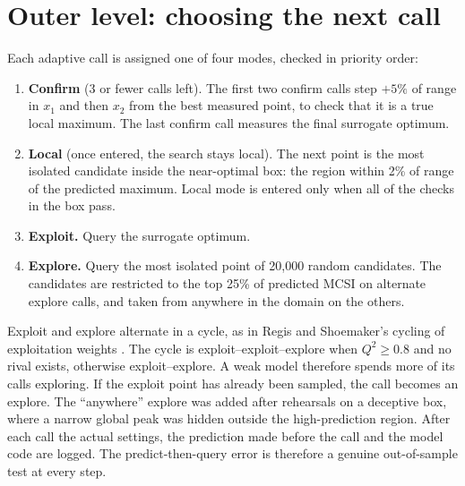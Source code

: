 \documentclass[11pt,a4paper]{article}
\newcommand{\Qsq}{Q^2}
\begin{document}
\section{Outer level: choosing the next call}
Each adaptive call is assigned one of four modes, checked in priority order:
\begin{enumerate}
\setlength{\itemsep}{0pt}
\item \textbf{Confirm} (3 or fewer calls left).
  The first two confirm calls step $+5\%$ of range in $x_1$ and then $x_2$ from the best measured point, to check that it is a true local maximum.
  The last confirm call measures the final surrogate optimum.
\item \textbf{Local} (once entered, the search stays local).
  The next point is the most isolated candidate inside the near-optimal box: the region within 2\% of range of the predicted maximum.
  Local mode is entered only when all of the checks in the box pass.

  \smallskip\noindent
  \smallskip
\item \textbf{Exploit.} Query the surrogate optimum.
\item \textbf{Explore.} Query the most isolated point of 20{,}000 random candidates.
  The candidates are restricted to the top 25\% of predicted MCSI on alternate explore calls, and taken from anywhere in the domain on the others.
\end{enumerate}
Exploit and explore alternate in a cycle, as in Regis and Shoemaker's cycling of exploitation weights \cite{Regis2005}.
The cycle is exploit--exploit--explore when $\Qsq\geq0.8$ and no rival exists, otherwise exploit--explore.
A weak model therefore spends more of its calls exploring.
If the exploit point has already been sampled, the call becomes an explore.
The ``anywhere'' explore was added after rehearsals on a deceptive box, where a narrow global peak was hidden outside the high-prediction region.
After each call the actual settings, the prediction made before the call and the model code are logged.
The predict-then-query error is therefore a genuine out-of-sample test at every step.
\end{document}
